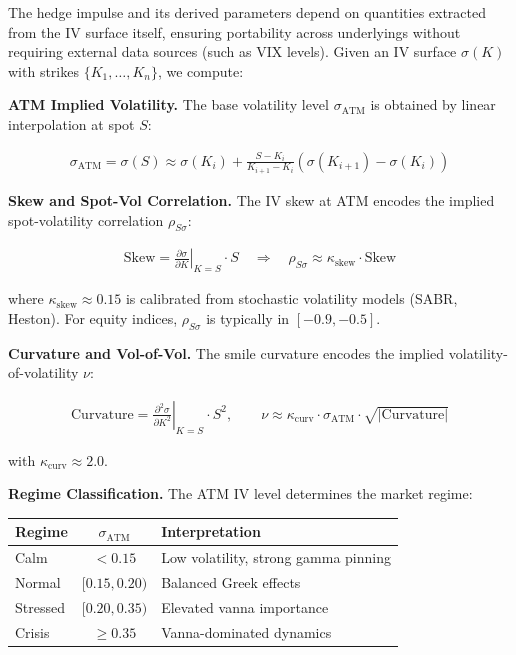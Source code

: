 \documentclass[11pt, a4paper]{article}
\begin{document}
The hedge impulse and its derived parameters depend on quantities extracted from the IV surface itself, ensuring portability across underlyings without requiring external data sources (such as VIX levels). Given an IV surface $\sigma(K)$ with strikes $\{K_1, \ldots, K_n\}$, we compute:

\textbf{ATM Implied Volatility.} The base volatility level $\sigma_{\text{ATM}}$ is obtained by linear interpolation at spot $S$:

\begin{align}
\sigma_{\text{ATM}} = \sigma(S) \approx \sigma(K_i) + \frac{S - K_i}{K_{i+1} - K_i} \left(\sigma(K_{i+1}) - \sigma(K_i)\right)
\end{align}

\textbf{Skew and Spot-Vol Correlation.} The IV skew at ATM encodes the implied spot-volatility correlation $\rho_{S\sigma}$:

\begin{align}
\text{Skew} = \left.\frac{\partial \sigma}{\partial K}\right|_{K=S} \cdot S \quad \Longrightarrow \quad \rho_{S\sigma} \approx \kappa_{\text{skew}} \cdot \text{Skew}
\end{align}

where $\kappa_{\text{skew}} \approx 0.15$ is calibrated from stochastic volatility models (SABR, Heston). For equity indices, $\rho_{S\sigma}$ is typically in $[-0.9, -0.5]$.

\textbf{Curvature and Vol-of-Vol.} The smile curvature encodes the implied volatility-of-volatility $\nu$:

\begin{align}
\text{Curvature} = \left.\frac{\partial^2 \sigma}{\partial K^2}\right|_{K=S} \cdot S^2, \qquad \nu \approx \kappa_{\text{curv}} \cdot \sigma_{\text{ATM}} \cdot \sqrt{|\text{Curvature}|}
\end{align}

with $\kappa_{\text{curv}} \approx 2.0$.

\textbf{Regime Classification.} The ATM IV level determines the market regime:

\begin{center}
\begin{tabular}{l|c|l}
\textbf{Regime} & $\sigma_{\text{ATM}}$ & \textbf{Interpretation} \\
\hline
Calm & $< 0.15$ & Low volatility, strong gamma pinning \\
Normal & $[0.15, 0.20)$ & Balanced Greek effects \\
Stressed & $[0.20, 0.35)$ & Elevated vanna importance \\
Crisis & $\geq 0.35$ & Vanna-dominated dynamics \\
\end{tabular}
\end{center}
\end{document}

